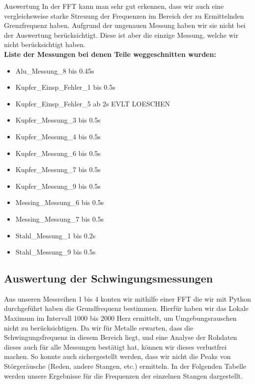 \documentclass[twoside]{protokoll}
\begin{document}
\begin{aufgabe}{Auswertung}
In der FFT kann man sehr gut erkennen, dass wir auch eine vergleichsweise starke Streuung der Frequenzen im Bereich der zu Ermittelnden Grenzfrequenz haben.
Aufgrund der ungenauen Messung haben wir sie nicht bei der Auswertung berücksichtigt.
Diese ist aber die einzige Messung, welche wir nicht berücksichtigt haben. \\
 

\textbf{Liste der Messungen bei denen Teile weggeschnitten wurden:}
\begin{itemize}
\item Alu\_Messung\_8 bis 0.45s
\item Kupfer\_Einsp\_Fehler\_1 bis 0.5s
\item Kupfer\_Einsp\_Fehler\_5 ab 2s EVLT LOESCHEN
\item Kupfer\_Messung\_3 bis 0.5s
\item Kupfer\_Messung\_4 bis 0.5s
\item Kupfer\_Messung\_6 bis 0.5s
\item Kupfer\_Messung\_7 bis 0.5s
\item Kupfer\_Messung\_9 bis 0.5s
\item Messing\_Messung\_6 bis 0.5s
\item Messing\_Messung\_7 bis 0.5s
\item Stahl\_Messung\_1 bis 0.2s
\item Stahl\_Messung\_9 bis 0.5s
\end{itemize}

 
\subsection{Auswertung der Schwingungsmessungen}
Aus unseren Messreihen 1 bis 4 konten wir mithilfe einer FFT die wir mit Python durchgeführt haben die Grundfrequenz bestimmen.
Hierfür haben wir das Lokale Maximum im Intervall 1000 bis 2000 Herz ermittelt, um Umgebungsrauschen nicht zu berücksichtigen.
Da wir für Metalle erwarten, dass die Schwingungsfrequenz in diesem Bereich liegt, und eine Analyse der Rohdaten dieses auch für alle Messungen bestätigt hat, können wir dieses verlustfrei machen.
So konnte auch sichergestellt werden, dass wir nicht die Peaks von Störgeräusche (Reden, andere Stangen, etc.) ermitteln.
In der Folgenden Tabelle werden unsere Ergebnisse für die Frequenzen der einzelnen Stangen dargestellt.



\end{aufgabe}
\end{document}
